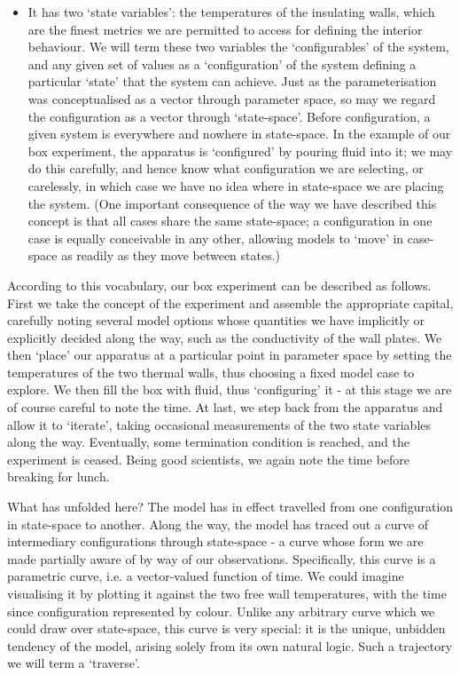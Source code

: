 \documentclass[a4paper,11pt,oneside]{book}
\begin{document}
\begin{itemize}
\item It has two `state variables': the temperatures of the insulating walls, which are the finest metrics we are permitted to access for defining the interior behaviour. We will term these two variables the `configurables' of the system, and any given set of values as a `configuration' of the system defining a particular `state' that the system can achieve. Just as the parameterisation was conceptualised as a vector through parameter space, so may we regard the configuration as a vector through `state-space'. Before configuration, a given system is everywhere and nowhere in state-space. In the example of our box experiment, the apparatus is `configured' by pouring fluid into it; we may do this carefully, and hence know what configuration we are selecting, or carelessly, in which case we have no idea where in state-space we are placing the system. (One important consequence of the way we have described this concept is that all cases share the same state-space; a configuration in one case is equally conceivable in any other, allowing models to `move' in case-space as readily as they move between states.)
\end{itemize}

According to this vocabulary, our box experiment can be described as follows. First we take the concept of the experiment and assemble the appropriate capital, carefully noting several model options whose quantities we have implicitly or explicitly decided along the way, such as the conductivity of the wall plates. We then `place' our apparatus at a particular point in parameter space by setting the temperatures of the two thermal walls, thus choosing a fixed model case to explore. We then fill the box with fluid, thus `configuring' it - at this stage we are of course careful to note the time. At last, we step back from the apparatus and allow it to `iterate', taking occasional measurements of the two state variables along the way. Eventually, some termination condition is reached, and the experiment is ceased. Being good scientists, we again note the time before breaking for lunch.

What has unfolded here? The model has in effect travelled from one configuration in state-space to another. Along the way, the model has traced out a curve of intermediary configurations through state-space - a curve whose form we are made partially aware of by way of our observations. Specifically, this curve is a parametric curve, i.e. a vector-valued function of time. We could imagine visualising it by plotting it against the two free wall temperatures, with the time since configuration represented by colour. Unlike any arbitrary curve which we could draw over state-space, this curve is very special: it is the unique, unbidden tendency of the model, arising solely from its own natural logic. Such a trajectory we will term a `traverse'.
\end{document}

